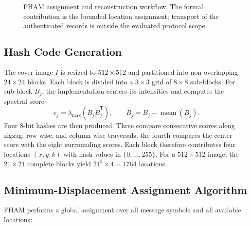 \documentclass[preprint,12pt]{elsarticle}
\theoremstyle{plain}
\providecommand{\DIFaddendFL}{} %
\DeclareRobustCommand{\DIFaddendFL}{\DIFOaddendFL \let\includegraphics\DIFOincludegraphics} %
\begin{document}
\begin{figure}[!t]
{%
}
\DIFaddendFL \caption{FHAM assignment and reconstruction workflow. The formal contribution is the bounded location assignment; transport of the authenticated records is outside the evaluated protocol scope.}
\label{fig:fham_workflow}
\end{figure}

\subsection{Hash Code Generation}

The cover image $I$ is resized to $512 \times 512$ and partitioned into
non-overlapping $24\times24$ blocks. Each block is divided into a $3\times3$
grid of $8\times8$ sub-blocks. For sub-block $B_j$, the implementation centers
its intensities and computes the spectral score
\begin{equation}
    e_j=\lambda_{\max}(\widetilde{B}_j\widetilde{B}_j^{\mathsf T}),
    \qquad \widetilde{B}_j=B_j-\operatorname{mean}(B_j).
\end{equation}
Four 8-bit hashes are then produced. Three compare consecutive scores along
zigzag, row-wise, and column-wise traversals; the fourth compares the center
score with the eight surrounding scores. Each block therefore contributes four
locations $(x,y,k)$ with hash values in $\{0,\ldots,255\}$. For a
$512\times512$ image, the $21\times21$ complete blocks yield
$21^2\times4=1764$ locations.

\subsection{Minimum-Displacement Assignment Algorithm}

FHAM performs a global assignment over all message symbols and all available
locations:
\end{document}
